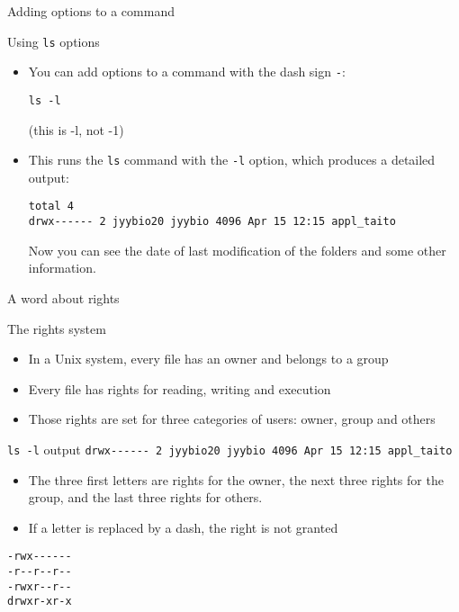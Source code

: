 \documentclass[big]{beamer}
\begin{document}
\begin{frame}[fragile,label=sec-2-11]{Adding options to a command}
 \begin{block}{Using \texttt{ls} options}
\begin{itemize}
\item You can add options to a command with the dash sign \texttt{-}:
\begin{verbatim}
ls -l
\end{verbatim}
(this is -l, not -1)

\item This runs the \texttt{ls} command with the \texttt{-l} option, which produces a detailed
output:
\begin{verbatim}
total 4
drwx------ 2 jyybio20 jyybio 4096 Apr 15 12:15 appl_taito
\end{verbatim}
Now you can see the date of last modification of the folders and some other
information.
\end{itemize}
\end{block}
\end{frame}
\begin{frame}[fragile,label=sec-2-12]{A word about rights}
 \begin{block}{The rights system}
\begin{itemize}
\item In a Unix system, every file has an \alert{owner} and belongs to a \alert{group}
\item Every file has rights for \alert{reading}, \alert{writing} and \alert{execution}
\item Those rights are set for three categories of users: \alert{owner}, \alert{group} and
  \alert{others}
\end{itemize}
\end{block}
\begin{block}{\texttt{ls -l} output}
\texttt{drwx-{}-{}-{}-{}-{}- 2 jyybio20 jyybio 4096 Apr 15 12:15 appl\_taito}
\begin{itemize}
\item The three first letters are rights for the owner, the next three rights for
the group, and the last three rights for others.
\item If a letter is replaced by a dash, the right is not granted
\end{itemize}
\begin{verbatim}
-rwx------
-r--r--r--
-rwxr--r--
drwxr-xr-x
\end{verbatim}
\end{block}
\end{frame}
\end{document}

